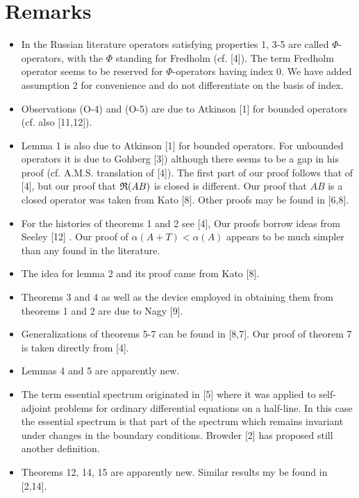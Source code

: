 \documentclass[11pt,twoside]{article}
\begin{document}
\section{Remarks}                                                              %
\begin{itemize}
\item[(R-1)]
In the Russian literature operators satisfying
properties 1, 3-5 are called $\Phi$-operators, with the $\Phi$ standing
for Fredholm (cf. [4]). The term Fredholm operator seems
to be reserved for $\Phi$-operators having index 0.
We have added assumption 2 for convenience and do not differentiate
on the basis of index.

\item[(R-2)]
Observations (O-4) and (O-5) are due to Atkinson [1] for bounded operators
(cf. also [11,12]).

\item[(R-3)]
Lemma 1 is also due to Atkinson [1] for bounded operators.
For unbounded operators it is due to Gohberg [3])
although there seems to be a gap in his proof (cf. A.M.S. translation of [4]).
The first part of our proof follows that of [4],
but our proof that $\mathfrak{R}(AB)$ is closed is different.
Our proof that $AB$ is a closed operator was taken from Kato [8].
Other proofs may be found in [6,8].

\item[(R-4)]
For the histories of theorems 1 and 2 see [4],
Our proofs borrow ideas from Seeley [12] .
Our proof of $\alpha(A+T) < \alpha(A)$ appears to be much simpler
than any found in the literature.

\item[(R-5)]
The idea for lemma 2 and its proof came from Kato [8].

\item[(R-6)]
Theorems 3 and 4 as well as the device employed in
obtaining them from theorems 1 and 2 are due to Nagy [9].

\item[(R-7)]
Generalizations of theorems 5-7 can be found in [8,7].
Our proof of theorem 7 is taken directly from [4].

\item[(R-8)]
Lemmas 4 and 5 are apparently new.

\item[(R-9)]
The term essential spectrum originated in [5] where
it was applied to self-adjoint problems for ordinary differential equations
on a half-line.
In this case the essential spectrum is that part of the spectrum
which remains invariant under changes in the boundary conditions.
Browder [2] has proposed still another definition.

\item[(R-10)]
Theorems 12, 14, 15 are apparently new.
Similar results my be found in [2,14].
\end{itemize}
\end{document}
